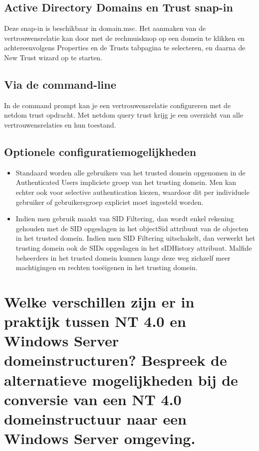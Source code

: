 \subsection{Active Directory Domains en Trust snap-in}

Deze snap-in is beschikbaar in domain.msc. Het aanmaken van de
vertrouwensrelatie kan door met de rechmuisknop op een domein te klikken en
achtereenvolgens Properties en de Trusts tabpagina te selecteren, en daarna de
New Trust wizard op te starten.

\subsection{Via de command-line}

In de command prompt kan je een vertrouwensrelatie configureren met de netdom
trust opdracht. Met netdom query trust krijg je een overzicht van alle
vertrouwensrelaties en hun toestand.

\subsection{Optionele configuratiemogelijkheden}
\begin{itemize}
	\item Standaard worden alle gebruikers van het trusted domein opgenomen
		in de Authenticated Users impliciete groep van het trusting
		domein. Men kan echter ook voor selective authentication kiezen,
		waardoor dit per individuele gebruiker of gebruikersgroep
		expliciet moet ingesteld worden.
	\item Indien men gebruik maakt van SID Filtering, dan wordt enkel
		rekening gehouden met de SID opgeslagen in het objectSid
		attribuut van de objecten in het trusted domein. Indien men SID
		Filtering uitschakelt, dan verwerkt het trusting domein ook de
		SIDs opgeslagen in het sIDHistory attribuut. Malfide beheerders
		in het trusted domein kunnen langs deze weg zichzelf meer
		machtigingen en rechten toe{\"e}igenen in het trusting domein.
\end{itemize}

\section{Welke verschillen zijn er in praktijk tussen NT 4.0 en Windows Server
domeinstructuren? Bespreek de alternatieve mogelijkheden bij de conversie van
een NT 4.0 domeinstructuur naar een Windows Server omgeving.}

